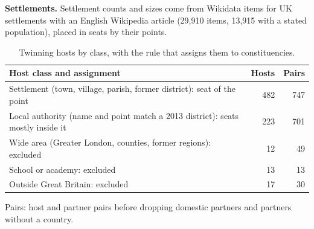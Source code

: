 \documentclass[11pt,a4paper]{article}
\begin{document}
\textbf{Settlements.} Settlement counts and sizes come from Wikidata items for UK settlements with an English Wikipedia article (29,910 items, 13,915 with a stated population), placed in seats by their points.

\begin{table}[H]\centering\footnotesize\begin{threeparttable}\caption{Twinning hosts by class, with the rule that assigns them to constituencies.}\label{tab:hosts}\begin{tabular}{p{10.5cm}rr}\toprule Host class and assignment & Hosts & Pairs\\\midrule
Settlement (town, village, parish, former district): seat of the point & 482 & 747\\
Local authority (name and point match a 2013 district): seats mostly inside it & 223 & 701\\
Wide area (Greater London, counties, former regions): excluded & 12 & 49\\
School or academy: excluded & 13 & 13\\
Outside Great Britain: excluded & 17 & 30\\
\bottomrule\end{tabular}\begin{tablenotes}\footnotesize\item Pairs: host and partner pairs before dropping domestic partners and partners without a country.\end{tablenotes}\end{threeparttable}\end{table}
\end{document}
